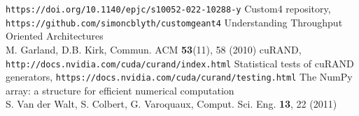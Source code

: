 \documentclass{webofc}
\begin{document}
\begin{thebibliography}{}
{\tt https://doi.org/10.1140/epjc/s10052-022-10288-y}
%
Custom4 repository, {\tt https://github.com/simoncblyth/customgeant4}
%
Understanding Throughput Oriented Architectures \\
M. Garland, D.B. Kirk, Commun. ACM {\bf 53}(11), 58 (2010) 
cuRAND, {\tt http://docs.nvidia.com/cuda/curand/index.html}
%
Statistical tests of cuRAND generators, {\tt https://docs.nvidia.com/cuda/curand/testing.html}
The NumPy array: a structure for efficient numerical computation \\
S. Van der Walt, S. Colbert, G. Varoquaux, Comput. Sci. Eng. {\bf 13}, 22 (2011)
%
\end{thebibliography}
%
\end{document}
